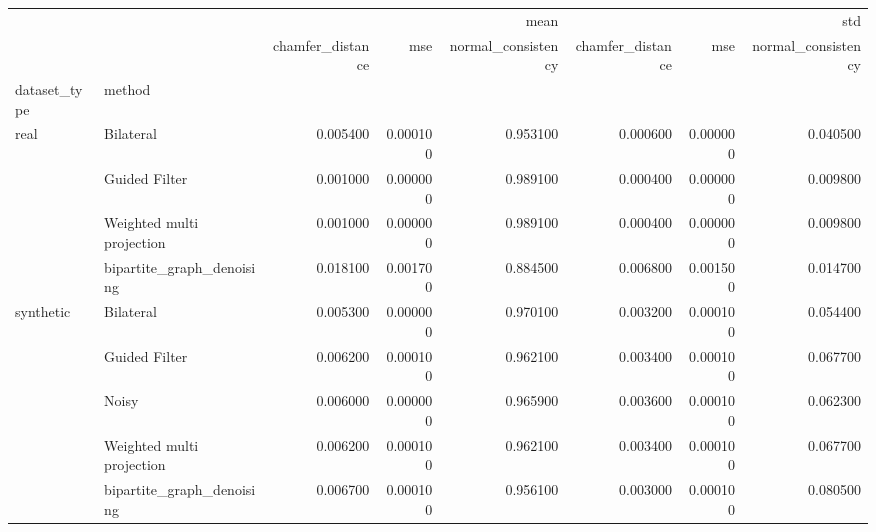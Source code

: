 \begin{tabular}{llrrrrrr}
\toprule
 &  & \multicolumn{3}{r}{mean} & \multicolumn{3}{r}{std} \\
 &  & chamfer_distance & mse & normal_consistency & chamfer_distance & mse & normal_consistency \\
dataset_type & method &  &  &  &  &  &  \\
\midrule
\multirow[t]{4}{*}{real} & Bilateral & 0.005400 & 0.000100 & 0.953100 & 0.000600 & 0.000000 & 0.040500 \\
 & Guided Filter & 0.001000 & 0.000000 & 0.989100 & 0.000400 & 0.000000 & 0.009800 \\
 & Weighted multi projection & 0.001000 & 0.000000 & 0.989100 & 0.000400 & 0.000000 & 0.009800 \\
 & bipartite_graph_denoising & 0.018100 & 0.001700 & 0.884500 & 0.006800 & 0.001500 & 0.014700 \\
\cline{1-8}
\multirow[t]{5}{*}{synthetic} & Bilateral & 0.005300 & 0.000000 & 0.970100 & 0.003200 & 0.000100 & 0.054400 \\
 & Guided Filter & 0.006200 & 0.000100 & 0.962100 & 0.003400 & 0.000100 & 0.067700 \\
 & Noisy & 0.006000 & 0.000000 & 0.965900 & 0.003600 & 0.000100 & 0.062300 \\
 & Weighted multi projection & 0.006200 & 0.000100 & 0.962100 & 0.003400 & 0.000100 & 0.067700 \\
 & bipartite_graph_denoising & 0.006700 & 0.000100 & 0.956100 & 0.003000 & 0.000100 & 0.080500 \\
\cline{1-8}
\bottomrule
\end{tabular}
